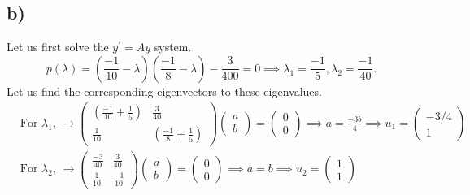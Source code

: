 \documentclass[
	12pt,
	]{article}
\newcommand{\p}{\prime}
\theoremstyle{definition}
\theoremstyle{definition}
\theoremstyle{definition}
\theoremstyle{definition}
\theoremstyle{definition}
\theoremstyle{example}
\theoremstyle{note}
\theoremstyle{remark}
\theoremstyle{example}
\begin{document}
 			 \subsection*{b) }
 			 	Let us first solve the $y^{\p} = A y$ system. 
 			 	$$ p(\lambda) = \left(\frac{-1}{10} - \lambda \right)\left(\frac{-1}{8} - \lambda \right) - \frac{3}{400} =0 \implies \lambda_{1} = \frac{-1}{5} , \lambda_{2} = \frac{-1}{40}.$$
 			 	Let us find the corresponding eigenvectors to these eigenvalues. 
 			 	\begin{align*}
 			 		&\text{For $\lambda_{1}$, } \xrightarrow{} 
 			 		\begin{pmatrix}
 			 			\left(\frac{-1}{10} + \frac{1}{5}\right) & \frac{3}{40} \\
 			 			\frac{1}{10} & \left(\frac{-1}{8} + \frac15 \right)
 			 		\end{pmatrix}
 			 		\begin{pmatrix}
 			 			a \\
 			 			b
 			 		\end{pmatrix}
 			 		= 
 			 		\begin{pmatrix}
 			 		0\\
 			 		0
 			 		\end{pmatrix}
 			 		\implies a = \frac{-3b}{4} \implies u_{1} = 
 			 		\begin{pmatrix}
 			 			-3/4\\
 			 			1
 			 		\end{pmatrix} \\
 			 		&\text{For $\lambda_{2}$, } \xrightarrow{} 
 			 		 			 		\begin{pmatrix}
 			 		 			 			\frac{-3}{40} & \frac{3}{40} \\
 			 		 			 			\frac{1}{10} & \frac{-1}{10}
 			 		 			 		\end{pmatrix}
 			 		 			 		\begin{pmatrix}
 			 		 			 			a \\
 			 		 			 			b
 			 		 			 		\end{pmatrix}
 			 		 			 		= 
 			 		 			 		\begin{pmatrix}
 			 		 			 		0\\
 			 		 			 		0
 			 		 			 		\end{pmatrix}
 			 		 			 		\implies a = b \implies u_{2} = 
 			 		 			 		\begin{pmatrix}
 			 		 			 			1\\
 			 		 			 			1
 			 		 			 		\end{pmatrix} 
 			 	\end{align*}
\end{document}
